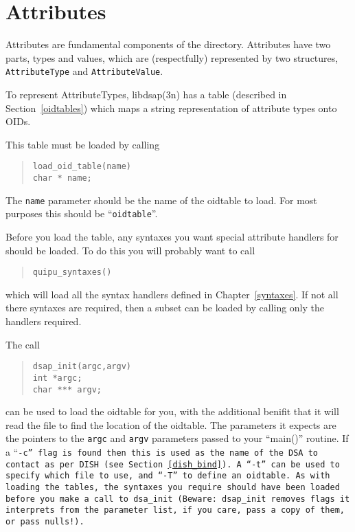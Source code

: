 \section {Attributes}

Attributes are fundamental
components of the directory.  
Attributes have two parts, types and values, which are
(respectfully) represented by two structures,
\verb"AttributeType" and \verb"AttributeValue".

To represent AttributeTypes, 
\man libdsap(3n) has a table (described in
Section~\ref{oidtables}) which maps a string representation of attribute
types onto OIDs.

This table must be loaded by calling
\begin{quote}\small\begin{verbatim}
load_oid_table(name)
char * name;
\end{verbatim}\end{quote}
The \verb"name" parameter should be the name of the oidtable to load.
For most purposes this should be ``\verb"oidtable"''.

Before you load the table, any syntaxes you want special attribute handlers
for should be loaded.  To do this you will probably want to call
\label{quipusyntaxes}
\begin{quote}\begin{verbatim}
quipu_syntaxes()
\end{verbatim}\end{quote}
which will load all the syntax handlers defined in Chapter~\ref{syntaxes}.
If not all there syntaxes are required, then a subset can be loaded by
calling only the handlers required.


The call
\begin{quote}\small\begin{verbatim}
dsap_init(argc,argv)
int *argc;
char *** argv;
\end{verbatim}\end{quote}
can be used to load the oidtable for you, with the additional 
benifit that it will
read the file  to 
find the location of the oidtable.
The parameters it expects are the pointers to the 
\verb"argc" and \verb"argv"
parameters passed to your ``main()'' routine.
If a ``\tt -c\rm '' flag is found then this is used as the name of
the DSA to contact as per DISH (see Section~\ref{dish_bind}).
A ``\tt -t\rm '' can be used to specify which  file to
use, and ``\tt -T\rm '' to define an oidtable.
As with loading the tables, the syntaxes you require should have been loaded
before you make a call to \verb+dsa_init+
(Beware: \verb"dsap_init" removes flags it interprets from the parameter list, if you care,
pass a copy of them, or pass nulls!).

